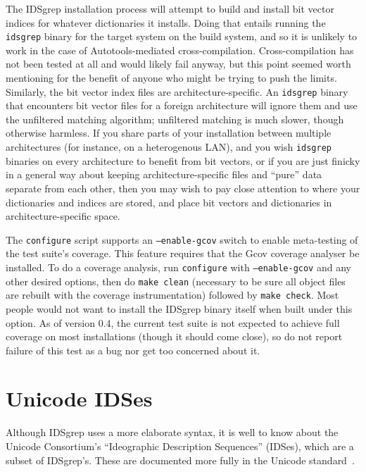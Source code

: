 \documentclass[twocolumn]{report}
\newcommand{\DangerousBend}{\marginpar{\large\hfill\dbend\hfill\null}}
\begin{document}
The \DangerousBend IDSgrep installation process will attempt to build and
install bit vector indices for whatever dictionaries it installs.  Doing
that entails running the \texttt{idsgrep} binary for the target system on
the build system, and so it is unlikely to work in the case of
Autotools-mediated cross-compilation.  Cross-compilation has not been tested
at all and would likely fail anyway, but this point seemed worth mentioning
for the benefit of anyone who might be trying to push the limits. 
Similarly, the bit vector index files are architecture-specific.  An
\texttt{idsgrep} binary that encounters bit vector files for a foreign
architecture will ignore them and use the unfiltered matching algorithm;
unfiltered matching is much slower, though otherwise harmless.  If you share
parts of your installation between multiple architectures (for instance, on
a heterogenous LAN), and you wish \texttt{idsgrep} binaries on every
architecture to benefit from bit vectors, or if you are just finicky in a
general way about keeping architecture-specific files and ``pure'' data
separate from each other, then you may wish to pay close attention to where
your dictionaries and indices are stored, and place bit vectors and
dictionaries in architecture-specific space.

The \DangerousBend\texttt{configure} script supports an
\texttt{--enable-gcov} switch to enable meta-testing of the test suite's
coverage.  This feature requires that the Gcov coverage analyser be
installed.  To do a coverage analysis, run \texttt{configure} with
\texttt{--enable-gcov} and any other desired options, then do \texttt{make
clean} (necessary to be sure all object files are rebuilt with the coverage
instrumentation) followed by \texttt{make check}.  Most people would not
want to install the IDSgrep binary itself when built under this option.  As
of version 0.4, the current test suite is not expected to achieve full
coverage on most installations (though it should come close), so do not
report failure of this test as a bug nor get too concerned about it.


\section{Unicode IDSes}

Although IDSgrep uses a more elaborate syntax, it is well to know
about the Unicode Consortium's ``Ideographic Description Sequences''
(IDSes), which are a subset of IDSgrep's.  These are documented
more fully in the Unicode standard~\cite{Unicode:IDS}.
\end{document}
